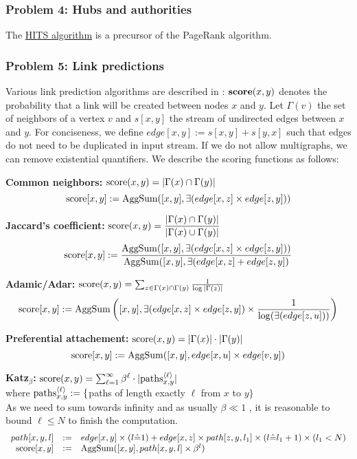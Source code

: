\documentclass[11pt]{article}
\begin{document}
\subsubsection*{Problem 4: Hubs and authorities}
The \href{http://en.wikipedia.org/wiki/HITS_algorithm}{HITS algorithm} is a precursor of the PageRank algorithm.

\subsubsection*{Problem 5: Link predictions}
Various link prediction algorithms are described in \cite{linkpred}: ${\bf score}(x,y)$ denotes the probability that a link will be created between nodes $x$ and $y$. Let $\Gamma(v)$ the set of neighbors of a vertex $v$ and $s[x,y]$ the stream of undirected edges between $x$ and $y$. For conciseness, we define $edge[x,y] := s[x,y]+s[y,x]$ such that edges do not need to be duplicated in input stream. If we do not allow multigraphs, we can remove existential quantifiers. We describe the scoring functions as follows:

{\bf Common neighbors:} ${\rm score}(x,y)=|\Gamma(x) \cap \Gamma(y)|$
\[{\rm score}[x,y] := {\rm AggSum}([x,y], \exists(edge[x,z] \times edge[z,y]))\]

{\bf Jaccard's coefficient:} ${\rm score}(x,y)=\dfrac{|\Gamma(x) \cap \Gamma(y)|}{|\Gamma(x) \cup \Gamma(y)|}$
\[{\rm score}[x,y] := \dfrac{{\rm AggSum}([x,y], \exists(edge[x,z] \times edge[z,y]))}
					{{\rm AggSum}([x,y], \exists(edge[x,z] + edge[z,y])}\]

{\bf Adamic/Adar:} ${\rm score}(x,y)=\sum_{z\in \Gamma(x) \cap \Gamma(y)}\frac{1}{\log|\Gamma(z)|}$
\[{\rm score}[x,y] := {\rm AggSum}\left([x,y], \exists(edge[x,z]\times edge[z,y])  \times \dfrac{1}{\log(\exists(edge[z,u]))}\right)\]

{\bf Preferential attachement:} ${\rm score}(x,y)=|\Gamma(x)| \cdot |\Gamma(y)|$
\[{\rm score}[x,y] := {\rm AggSum}([x,y], edge[x,u] \times edge[v,y])\]

{\bf Katz${}_{\beta}$:} ${\rm score}(x,y)=\sum_{\ell=1}^{\infty} \beta^\ell \cdot |{\rm paths}_{x,y}^{\langle\ell\rangle}|$ \\where ${\rm paths}_{x,y}^{\langle\ell\rangle} := \{$paths of length exactly $\ell$ from $x$ to $y\}$\\
As we need to sum towards infinity and as usually $\beta \ll 1$ \cite{linkpred}, it is reasonable to bound $\ell \le N$ to finish the computation.
\[\begin{array}{rcl}
path[x,y,l] &:=& edge[x,y] \times (l\hat=1) +  edge[x,z] \times path[z,y,l_1] \times (l\hat= l_1+1) \times (l_1<N)\\
{\rm score}[x,y] &:=& {\rm AggSum}([x,y], path[x,y,l] \times \beta^l )
\end{array}\]
\end{document}
